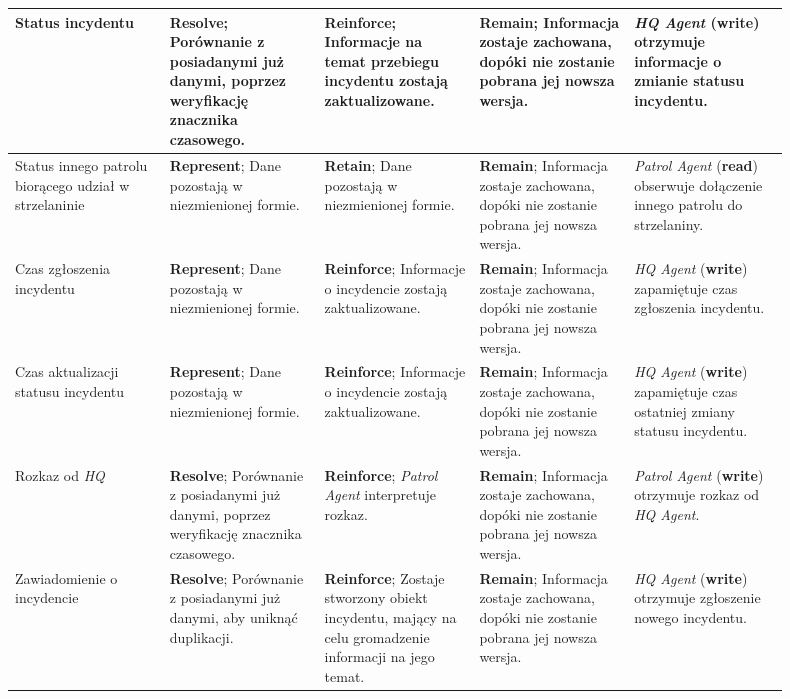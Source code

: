 \begin{landscape}
\begin{longtable}{|p{0.18\linewidth}|p{0.18\linewidth}|p{0.18\linewidth}|p{0.18\linewidth}|p{0.18\linewidth}|}
     Status incydentu & \textbf{Resolve}; Porównanie z posiadanymi już danymi, poprzez weryfikację znacznika czasowego. & \textbf{Reinforce}; Informacje na temat przebiegu incydentu zostają zaktualizowane. & \textbf{Remain}; Informacja zostaje zachowana, dopóki nie zostanie pobrana jej nowsza wersja.  & \emph{HQ Agent} (\textbf{write}) otrzymuje informacje o zmianie statusu incydentu. \\
     \hline

     Status innego patrolu biorącego udział w strzelaninie & \textbf{Represent}; Dane pozostają w niezmienionej formie. & \textbf{Retain}; Dane pozostają w niezmienionej formie. & \textbf{Remain}; Informacja zostaje zachowana, dopóki nie zostanie pobrana jej nowsza wersja. & \emph{Patrol Agent} (\textbf{read}) obserwuje dołączenie innego patrolu do strzelaniny. \\
     \hline

     Czas zgłoszenia incydentu & \textbf{Represent}; Dane pozostają w niezmienionej formie. & \textbf{Reinforce}; Informacje o incydencie zostają zaktualizowane. & \textbf{Remain}; Informacja zostaje zachowana, dopóki nie zostanie pobrana jej nowsza wersja. & \emph{HQ Agent} (\textbf{write}) zapamiętuje czas zgłoszenia incydentu. \\
     \hline

     Czas aktualizacji statusu incydentu & \textbf{Represent}; Dane pozostają w niezmienionej formie. & \textbf{Reinforce}; Informacje o incydencie zostają zaktualizowane. & \textbf{Remain}; Informacja zostaje zachowana, dopóki nie zostanie pobrana jej nowsza wersja. & \emph{HQ Agent} (\textbf{write}) zapamiętuje czas ostatniej zmiany statusu incydentu. \\
     \hline

     Rozkaz od \emph{HQ} & \textbf{Resolve}; Porównanie z posiadanymi już danymi, poprzez weryfikację znacznika czasowego. & \textbf{Reinforce}; \emph{Patrol Agent} interpretuje rozkaz. & \textbf{Remain}; Informacja zostaje zachowana, dopóki nie zostanie pobrana jej nowsza wersja.  & \emph{Patrol Agent} (\textbf{write}) otrzymuje rozkaz od \emph{HQ Agent}. \\
     \hline

     Zawiadomienie o incydencie & \textbf{Resolve}; Porównanie z posiadanymi już danymi, aby uniknąć duplikacji. & \textbf{Reinforce}; Zostaje stworzony obiekt incydentu, mający na celu gromadzenie informacji na jego temat. & \textbf{Remain}; Informacja zostaje zachowana, dopóki nie zostanie pobrana jej nowsza wersja. & \emph{HQ Agent} (\textbf{write}) otrzymuje zgłoszenie nowego incydentu. \\
     \hline


\end{longtable}
\end{landscape}
